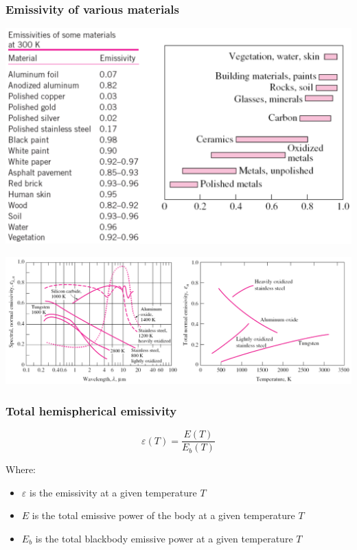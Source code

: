 \documentclass[11pt]{article}
\begin{document}
\subsubsection{Emissivity of various materials}
\label{sec:org98b63bd}
\begin{center}
\includegraphics[width=.9\linewidth]{./images/emissivity-of-various-materials-table.png}
\end{center}
\begin{center}
\includegraphics[width=.9\linewidth]{./images/emissivity-of-various-materials-graph.png}
\end{center}

\subsubsection{Total hemispherical emissivity}
\label{sec:org81a9519}
\[\varepsilon (T) = \frac{E(T)}{E_b(T)}\]

Where:
\begin{itemize}
\item \(\varepsilon\) is the emissivity at a given temperature \(T\)
\item \(E\) is the total emissive power of the body at a given temperature \(T\)
\item \(E_b\) is the total blackbody emissive power at a given temperature \(T\)
\end{itemize}
\end{document}
